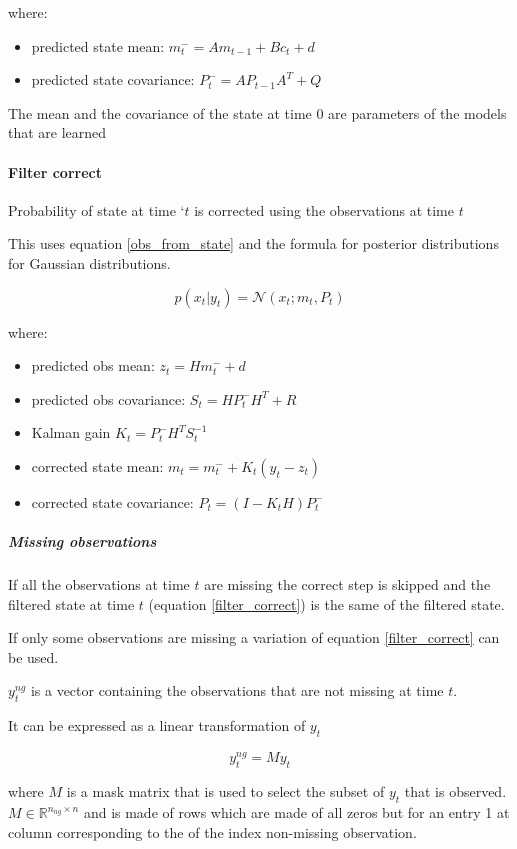 \documentclass{article}
\begin{document}
where:
\begin{itemize}
    \item predicted state mean: $m_t^- = Am_{t-1} + B c_t + d$   
    \item predicted state covariance: $P_t^- = AP_{t-1}A^T + Q$
\end{itemize}

The mean and the covariance of the state at time $0$ are parameters of the models that are learned

\paragraph{Filter correct}

Probability of state at time `$t$ is corrected using the observations at time $t$

This uses equation \ref{obs_from_state} and the formula for posterior distributions for Gaussian distributions.

\begin{equation}\label{filter_correct}
 p(x_t|y_t) = \mathcal{N}(x_t; m_t, P_t)   
\end{equation}
    
where:

\begin{itemize}
    \item predicted obs mean: $z_t = Hm_t^- + d$   
    \item predicted obs covariance: $S_t = HP_t^-H^T + R$
    \item Kalman gain $K_t = P_t^-H^TS_t^{-1}$ 
    \item corrected state mean: $m_t = m_t^- + K_t(y_t - z_t)$ 
    \item corrected state covariance: $P_t = (I-K_tH)P_t^-$ 
\end{itemize}

\subparagraph{Missing observations}
If all the observations at time $t$ are missing the correct step is skipped and the filtered state at time $t$ (equation \ref{filter_correct}) is the same of the filtered state.

If only some observations are missing a variation of equation \ref{filter_correct} can be used.

$y^{ng}_t$ is a vector containing the observations that are not missing at time $t$. 

It can be expressed as a linear transformation of $y_t$

$$ y^{ng}_t = My_t$$

where $M$ is a mask matrix that is used to select the subset of $y_t$ that is observed. $M \in \mathbb{R}^{n_{ng} \times n}$ and is made of rows which are made of all zeros but for an entry 1 at column corresponding to the of the index non-missing observation.
\end{document}
